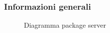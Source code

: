 \subsection{}
\label{\nogloxy{swedesigner::server}}
\subsubsection{Informazioni generali}
\begin{figure}[H]
	\caption{Diagramma package server}
\end{figure}

